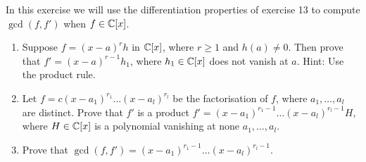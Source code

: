 \begin{exercise}{14}
In this exercise we will use the differentiation properties of exercise 13 to compute $\gcd(f,f')$ when $f\in\mathbb{C}[x]$.
\begin{enumerate}
    \item Suppose $f=(x-a)^rh$ in $\mathbb{C}[x]$, where $r\geq 1$ and $h(a)\neq 0$. 
    Then prove that $f'=(x-a)^{r-1}h_1$, where $h_1\in\mathbb{C}[x]$ does not vanish at $a$. 
    Hint: Use the product rule.
    \item Let $f=c(x-a_1)^{r_1}\dots(x-a_l)^{r_l}$ be the factorisation of $f$, where $a_1,\dots,a_l$ are distinct. 
    Prove that $f'$ is a product $f'=(x-a_1)^{r_1-1}\dots(x-a_l)^{r_l-1}H$, where $H\in\mathbb{C}[x]$ is a polynomial vanishing at none $a_1,\dots,a_l$.
    \item Prove that $\gcd(f,f')=(x-a_1)^{r_1-1}\dots(x-a_l)^{r_l-1}$.
\end{enumerate}
\end{exercise}
